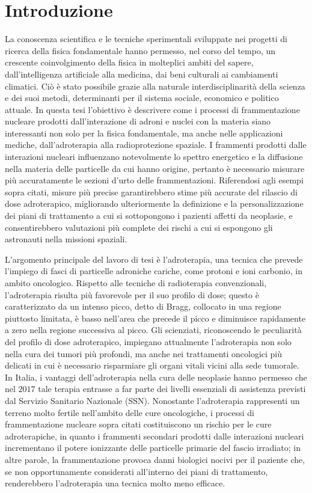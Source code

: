 \documentclass[12pt,a4paper,twoside]{report}
\begin{document}
	\chapter*{Introduzione}
	La conoscenza scientifica e le tecniche sperimentali sviluppate nei progetti di ricerca della fisica fondamentale hanno permesso, nel corso del tempo, un crescente coinvolgimento della fisica in molteplici ambiti del sapere, dall'intelligenza artificiale alla medicina, dai beni culturali ai cambiamenti climatici. Ciò è stato possibile grazie alla naturale interdisciplinarità della scienza e dei suoi metodi, determinanti per il sistema sociale, economico e politico attuale. In questa tesi l'obiettivo è descrivere come i processi di frammentazione nucleare prodotti dall'interazione di adroni e nuclei con la materia siano interessanti non solo per la fisica fondamentale, ma anche nelle applicazioni mediche, dall'adroterapia alla radioprotezione spaziale. I frammenti prodotti dalle interazioni nucleari influenzano notevolmente lo spettro energetico e la diffusione nella materia delle particelle da cui hanno origine, pertanto è necessario misurare più accuratamente le sezioni d'urto delle frammentazioni. Riferendosi agli esempi sopra citati, misure più precise garantirebbero stime più accurate del rilascio di dose adroterapico, migliorando ulteriormente la definizione e la personalizzazione dei piani di trattamento a cui si sottopongono i pazienti affetti da neoplasie, e consentirebbero valutazioni più complete dei rischi a cui si espongono gli astronauti nella missioni spaziali.
	
	L'argomento principale del lavoro di tesi è l'adroterapia, una tecnica che prevede l'impiego di fasci di particelle adroniche cariche, come protoni e ioni carbonio, in ambito oncologico. Rispetto alle tecniche di radioterapia convenzionali, l'adroterapia risulta più favorevole per il suo profilo di dose; questo è caratterizzato da un intenso picco, detto di Bragg, collocato in una regione piuttosto limitata, è basso nell'area che precede il picco e diminuisce rapidamente a zero nella regione successiva al picco. Gli scienziati, riconoscendo le peculiarità del profilo di dose adroterapico, impiegano attualmente l'adroterapia non solo nella cura dei tumori più profondi, ma anche nei trattamenti oncologici più delicati in cui è necessario risparmiare gli organi vitali vicini alla sede tumorale. In Italia, i vantaggi dell'adroterapia nella cura delle neoplasie hanno permesso che nel $2017$ tale terapia entrasse a far parte dei livelli essenziali di assistenza previsti dal Servizio Sanitario Nazionale (SSN). Nonostante l'adroterapia rappresenti un terreno molto fertile nell'ambito delle cure oncologiche, i processi di frammentazione nucleare sopra citati costituiscono un rischio per le cure adroterapiche, in quanto i frammenti secondari prodotti dalle interazioni nucleari incrementano il potere ionizzante delle particelle primarie del fascio irradiato; in altre parole, la frammentazione provoca danni biologici nocivi per il paziente che, se non opportunamente considerati all'interno dei piani di trattamento, renderebbero l'adroterapia una tecnica molto meno efficace.
	
\end{document}
